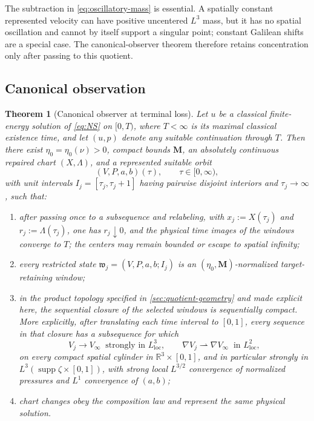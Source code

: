 \documentclass[11pt]{amsart}
\numberwithin{equation}{section}
\theoremstyle{plain}
\newtheorem{theorem}{Theorem}[section]
\theoremstyle{definition}
\theoremstyle{remark}
\newcommand{\R}{\mathbb R}
\newcommand{\supp}{\operatorname{supp}}
\begin{document}
The subtraction in \eqref{eq:oscillatory-mass} is essential.  A spatially
constant represented velocity can have positive uncentered \(L^3\) mass, but
it has no spatial oscillation and cannot by itself support a singular point;
constant Galilean shifts are a special case.  The canonical-observer theorem
therefore retains concentration only after passing to this quotient.

\subsection{Canonical observation}

\begin{theorem}[Canonical observer at terminal loss]
\label{thm:canonical-critical-orbit}
Let \(u\) be a classical finite-energy solution of \eqref{eq:NS} on
\([0,T)\), where \(T<\infty\) is its maximal classical existence time, and
let \((u,p)\) denote any suitable continuation through \(T\).  Then there
exist \(\eta_0=\eta_0(\nu)>0\), compact bounds \(\mathbf M\), an absolutely
continuous repaired chart \((X,\Lambda)\), and a represented suitable orbit
\[
 (V,P,a,b)(\tau),\qquad \tau\in[0,\infty),
\]
with unit intervals \(I_j=[\tau_j,\tau_j+1]\) having pairwise disjoint
interiors and \(\tau_j\to\infty\), such that:
\begin{enumerate}[label=\textup{(\roman*)},leftmargin=2.2em]
\item after passing once to a subsequence and relabeling, with
\(x_j:=X(\tau_j)\) and \(r_j:=\Lambda(\tau_j)\), one has
\(r_j\downarrow0\), and the physical time images of the windows converge to
\(T\); the centers may remain bounded or escape to spatial infinity;
\item every restricted state
\(\mathfrak w_j=(V,P,a,b;I_j)\) is an
\((\eta_0,\mathbf M)\)-normalized target-retaining window;
\item in the product topology specified in \cref{sec:quotient-geometry} and
made explicit here, the sequential closure of the selected windows is
sequentially compact.  More explicitly, after translating
each time interval to \([0,1]\), every sequence in that closure has a
subsequence for which
\begin{equation}\label{eq:critical-orbit-compactness}
 V_j\to V_\infty\ \text{ strongly in }L^3_{\mathrm{loc}},
 \qquad
 \nabla V_j\rightharpoonup\nabla V_\infty
 \ \text{ in }L^2_{\mathrm{loc}},
\end{equation}
 on every compact spatial cylinder in \(\R^3\times[0,1]\), and in particular
 strongly in \(L^3(\supp\zeta\times[0,1])\),
 with strong local \(L^{3/2}\) convergence of normalized pressures and
 \(L^1\) convergence of \((a,b)\);
\item chart changes obey the composition law and represent the same physical
solution.
\end{enumerate}
\end{theorem}
\end{document}
